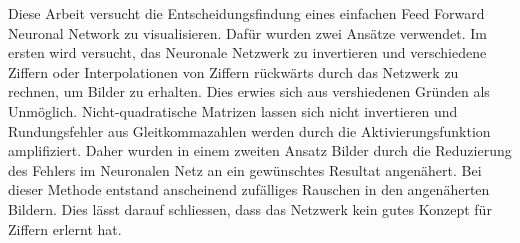 \documentclass[Interploate_hadwritten_Digits.tex]{subfiles}
\begin{document}
	Diese Arbeit versucht die Entscheidungsfindung eines einfachen Feed Forward Neuronal Network zu visualisieren. Dafür wurden zwei Ansätze verwendet. Im ersten wird versucht, das Neuronale Netzwerk zu invertieren und verschiedene Ziffern oder Interpolationen von Ziffern rückwärts durch das Netzwerk zu rechnen, um Bilder zu erhalten. Dies erwies sich aus vershiedenen Gründen als Unmöglich. Nicht-quadratische Matrizen lassen sich nicht invertieren und Rundungsfehler aus Gleitkommazahlen werden durch die Aktivierungsfunktion amplifiziert. Daher wurden in einem zweiten Ansatz Bilder durch die Reduzierung des Fehlers im Neuronalen Netz an ein gewünschtes Resultat angenähert. Bei dieser Methode entstand anscheinend zufälliges Rauschen in den angenäherten Bildern. Dies lässt darauf schliessen, dass das Netzwerk kein gutes Konzept für Ziffern erlernt hat.
\end{document}
